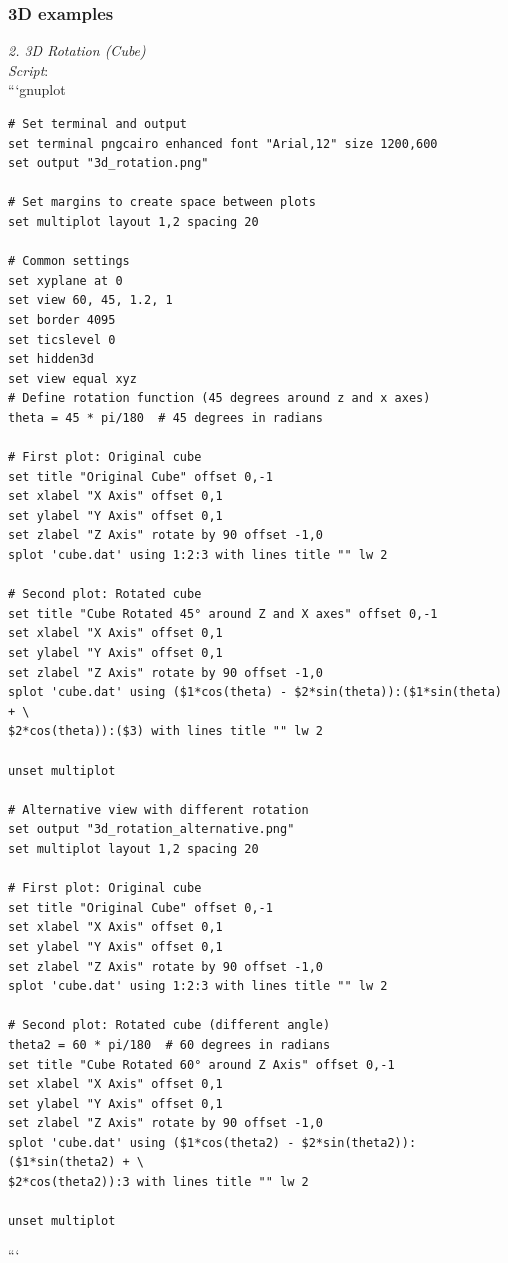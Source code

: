 \documentclass[a4paper,10pt]{article}
\begin{document}
\subsubsection{3D examples}
\emph{2. 3D Rotation (Cube)}\\
\emph{Script}:\\
```gnuplot\\
\begin{verbatim}
# Set terminal and output
set terminal pngcairo enhanced font "Arial,12" size 1200,600
set output "3d_rotation.png"

# Set margins to create space between plots
set multiplot layout 1,2 spacing 20

# Common settings
set xyplane at 0
set view 60, 45, 1.2, 1
set border 4095
set ticslevel 0
set hidden3d
set view equal xyz
# Define rotation function (45 degrees around z and x axes)
theta = 45 * pi/180  # 45 degrees in radians

# First plot: Original cube
set title "Original Cube" offset 0,-1
set xlabel "X Axis" offset 0,1
set ylabel "Y Axis" offset 0,1
set zlabel "Z Axis" rotate by 90 offset -1,0
splot 'cube.dat' using 1:2:3 with lines title "" lw 2

# Second plot: Rotated cube
set title "Cube Rotated 45° around Z and X axes" offset 0,-1
set xlabel "X Axis" offset 0,1
set ylabel "Y Axis" offset 0,1
set zlabel "Z Axis" rotate by 90 offset -1,0
splot 'cube.dat' using ($1*cos(theta) - $2*sin(theta)):($1*sin(theta) + \
$2*cos(theta)):($3) with lines title "" lw 2

unset multiplot

# Alternative view with different rotation
set output "3d_rotation_alternative.png"
set multiplot layout 1,2 spacing 20

# First plot: Original cube
set title "Original Cube" offset 0,-1
set xlabel "X Axis" offset 0,1
set ylabel "Y Axis" offset 0,1
set zlabel "Z Axis" rotate by 90 offset -1,0
splot 'cube.dat' using 1:2:3 with lines title "" lw 2

# Second plot: Rotated cube (different angle)
theta2 = 60 * pi/180  # 60 degrees in radians
set title "Cube Rotated 60° around Z Axis" offset 0,-1
set xlabel "X Axis" offset 0,1
set ylabel "Y Axis" offset 0,1
set zlabel "Z Axis" rotate by 90 offset -1,0
splot 'cube.dat' using ($1*cos(theta2) - $2*sin(theta2)):($1*sin(theta2) + \
$2*cos(theta2)):3 with lines title "" lw 2

unset multiplot
\end{verbatim}
```\\
\end{document}
